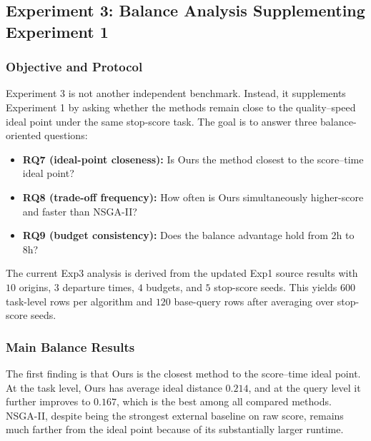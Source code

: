 \subsection{Experiment 3: Balance Analysis Supplementing Experiment 1}
\subsubsection{Objective and Protocol}
Experiment 3 is not another independent benchmark.
Instead, it supplements Experiment 1 by asking whether the methods remain close
to the quality--speed ideal point under the same stop-score task.
The goal is to answer three balance-oriented questions:
\begin{itemize}[leftmargin=1.5em]
    \item \textbf{RQ7 (ideal-point closeness):} Is Ours the method closest to the score--time ideal point?
    \item \textbf{RQ8 (trade-off frequency):} How often is Ours simultaneously higher-score and faster than NSGA-II?
    \item \textbf{RQ9 (budget consistency):} Does the balance advantage hold from 2h to 8h?
\end{itemize}

The current Exp3 analysis is derived from the updated Exp1 source results with
\(10\) origins, \(3\) departure times, \(4\) budgets, and \(5\) stop-score seeds.
This yields \(600\) task-level rows per algorithm and \(120\) base-query rows
after averaging over stop-score seeds.

\subsubsection{Main Balance Results}
The first finding is that Ours is the closest method to the score--time ideal point.
At the task level, Ours has average ideal distance \(0.214\), and at the query level
it further improves to \(0.167\), which is the best among all compared methods.
NSGA-II, despite being the strongest external baseline on raw score, remains much farther
from the ideal point because of its substantially larger runtime.

